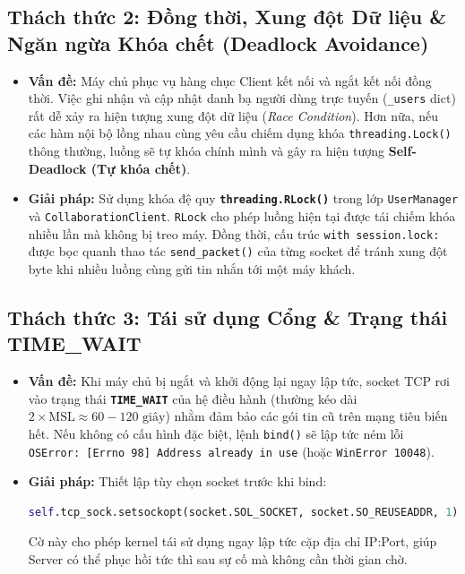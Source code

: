 \documentclass[11pt,a4paper]{article}
\begin{document}
\subsection{Thách thức 2: Đồng thời, Xung đột Dữ liệu \& Ngăn ngừa Khóa chết (Deadlock Avoidance)}
\begin{itemize}
    \item \textbf{Vấn đề:} Máy chủ phục vụ hàng chục Client kết nối và ngắt kết nối đồng thời. Việc ghi nhận và cập nhật danh bạ người dùng trực tuyến (\texttt{_users} dict) rất dễ xảy ra hiện tượng xung đột dữ liệu (\textit{Race Condition}). Hơn nữa, nếu các hàm nội bộ lồng nhau cùng yêu cầu chiếm dụng khóa \texttt{threading.Lock()} thông thường, luồng sẽ tự khóa chính mình và gây ra hiện tượng \textbf{Self-Deadlock (Tự khóa chết)}.
    \item \textbf{Giải pháp:} Sử dụng khóa đệ quy \textbf{\texttt{threading.RLock()}} trong lớp \texttt{UserManager} và \texttt{CollaborationClient}. \texttt{RLock} cho phép luồng hiện tại được tái chiếm khóa nhiều lần mà không bị treo máy. Đồng thời, cấu trúc \texttt{with session.lock:} được bọc quanh thao tác \texttt{send\_packet()} của từng socket để tránh xung đột byte khi nhiều luồng cùng gửi tin nhắn tới một máy khách.
\end{itemize}

\subsection{Thách thức 3: Tái sử dụng Cổng \& Trạng thái TIME\_WAIT}
\begin{itemize}
    \item \textbf{Vấn đề:} Khi máy chủ bị ngắt và khởi động lại ngay lập tức, socket TCP rơi vào trạng thái \textbf{\texttt{TIME\_WAIT}} của hệ điều hành (thường kéo dài $2 \times \text{MSL} \approx 60 - 120\text{ giây}$) nhằm đảm bảo các gói tin cũ trên mạng tiêu biến hết. Nếu không có cấu hình đặc biệt, lệnh \texttt{bind()} sẽ lập tức ném lỗi \texttt{OSError: [Errno 98] Address already in use} (hoặc \texttt{WinError 10048}).
    \item \textbf{Giải pháp:} Thiết lập tùy chọn socket trước khi bind:
\begin{lstlisting}[language=Python]
self.tcp_sock.setsockopt(socket.SOL_SOCKET, socket.SO_REUSEADDR, 1)
\end{lstlisting}
    Cờ này cho phép kernel tái sử dụng ngay lập tức cặp địa chỉ IP:Port, giúp Server có thể phục hồi tức thì sau sự cố mà không cần thời gian chờ.
\end{itemize}
\end{document}
